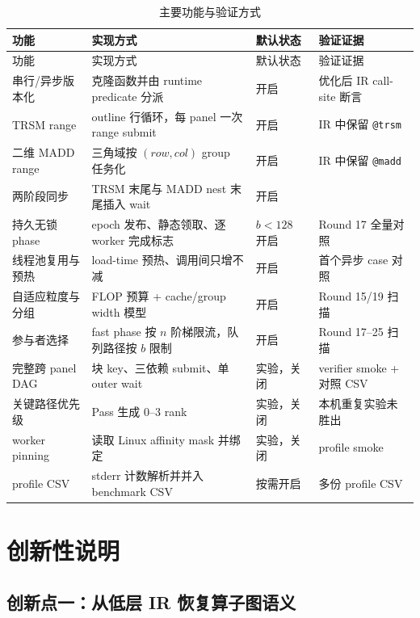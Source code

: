 \documentclass[UTF8,a4paper,openany,11pt,fontset=fandol]{ctexrep}
\renewcommand{\arraystretch}{1.25}
\begin{document}
{\small
\renewcommand{\arraystretch}{1.12}
\begin{longtable}{L{3.25cm}L{4.4cm}L{3.0cm}L{3.0cm}}
  \caption{主要功能与验证方式}\label{tab:functions}\\
  \toprule
  功能 & 实现方式 & 默认状态 & 验证证据 \\
  \midrule
  \endfirsthead
  \toprule
  功能 & 实现方式 & 默认状态 & 验证证据 \\
  \midrule
  \endhead
  串行/异步版本化 & 克隆函数并由 runtime predicate 分派 & 开启 & 优化后 IR call-site 断言 \\
  TRSM range & outline 行循环，每 panel 一次 range submit & 开启 & IR 中保留 \texttt{@trsm} \\
  二维 MADD range & 三角域按 \((row,col)\) group 任务化 & 开启 & IR 中保留 \texttt{@madd} \\
  两阶段同步 & TRSM 末尾与 MADD nest 末尾插入 wait & 开启 &  \\
  持久无锁 phase & epoch 发布、静态领取、逐 worker 完成标志 & \(b<128\) 开启 & Round 17 全量对照 \\
  线程池复用与预热 & load-time 预热、调用间只增不减 & 开启 & 首个异步 case 对照 \\
  自适应粒度与分组 & FLOP 预算 + cache/group width 模型 & 开启 & Round 15/19 扫描 \\
  参与者选择 & fast phase 按 \(n\) 阶梯限流，队列路径按 \(b\) 限制 & 开启 & Round 17--25 扫描 \\
  完整跨 panel DAG & 块 key、三依赖 submit、单 outer wait & 实验，关闭 & verifier smoke + 对照 CSV \\
  关键路径优先级 & Pass 生成 0--3 rank & 实验，关闭 & 本机重复实验未胜出 \\
  worker pinning & 读取 Linux affinity mask 并绑定 & 实验，关闭 & profile smoke \\
  profile CSV & stderr 计数解析并并入 benchmark CSV & 按需开启 & 多份 profile CSV \\
  \bottomrule
\end{longtable}
}

\chapter{创新性说明}

\section{创新点一：从低层 IR 恢复算子图语义}
\end{document}
